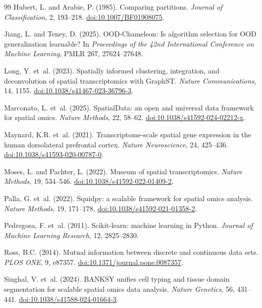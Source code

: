 \documentclass[12pt]{article}
\begin{document}
\begin{thebibliography}{99}
Hubert, L. and Arabie, P. (1985). Comparing partitions.
\emph{Journal of Classification}, 2, 193--218.
\href{https://doi.org/10.1007/BF01908075}{doi:10.1007/BF01908075}.

Jiang, L. and Teney, D. (2025). OOD-Chameleon: Is algorithm selection for OOD
generalization learnable? In \emph{Proceedings of the 42nd International
Conference on Machine Learning}, PMLR 267, 27624--27648.

Long, Y. et~al. (2023). Spatially informed clustering, integration, and
deconvolution of spatial transcriptomics with GraphST.
\emph{Nature Communications}, 14, 1155.
\href{https://doi.org/10.1038/s41467-023-36796-3}{doi:10.1038/s41467-023-36796-3}.

Marconato, L. et~al. (2025). SpatialData: an open and universal data framework
for spatial omics. \emph{Nature Methods}, 22, 58--62.
\href{https://doi.org/10.1038/s41592-024-02212-x}{doi:10.1038/s41592-024-02212-x}.

Maynard, K.R. et~al. (2021). Transcriptome-scale spatial gene expression in
the human dorsolateral prefrontal cortex. \emph{Nature Neuroscience}, 24,
425--436. \href{https://doi.org/10.1038/s41593-020-00787-0}{doi:10.1038/s41593-020-00787-0}.

Moses, L. and Pachter, L. (2022). Museum of spatial transcriptomics.
\emph{Nature Methods}, 19, 534--546.
\href{https://doi.org/10.1038/s41592-022-01409-2}{doi:10.1038/s41592-022-01409-2}.

Palla, G. et~al. (2022). Squidpy: a scalable framework for spatial omics
analysis. \emph{Nature Methods}, 19, 171--178.
\href{https://doi.org/10.1038/s41592-021-01358-2}{doi:10.1038/s41592-021-01358-2}.

Pedregosa, F. et~al. (2011). Scikit-learn: machine learning in Python.
\emph{Journal of Machine Learning Research}, 12, 2825--2830.

Ross, B.C. (2014). Mutual information between discrete and continuous data
sets. \emph{PLOS ONE}, 9, e87357.
\href{https://doi.org/10.1371/journal.pone.0087357}{doi:10.1371/journal.pone.0087357}.

Singhal, V. et~al. (2024). BANKSY unifies cell typing and tissue domain
segmentation for scalable spatial omics data analysis.
\emph{Nature Genetics}, 56, 431--441.
\href{https://doi.org/10.1038/s41588-024-01664-3}{doi:10.1038/s41588-024-01664-3}.


\end{thebibliography}
\end{document}
